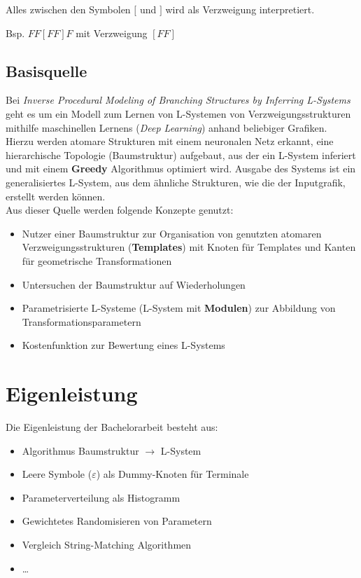 \documentclass[11pt]{article}
\begin{document}
    \newpage
    Alles zwischen den Symbolen $[$ und $]$ wird als Verzweigung interpretiert.
    \begin{center}
        Bsp. $FF[FF]F$ mit Verzweigung $[FF]$
    \end{center}

    \subsection{Basisquelle}
    Bei \textit{Inverse Procedural Modeling of Branching Structures by Inferring L-Systems}\cite{2} geht es um ein
    Modell zum Lernen von L-Systemen von Verzweigungsstrukturen mithilfe maschinellen Lernens (\textit{Deep
    Learning}) anhand beliebiger Grafiken.
    Hierzu werden atomare Strukturen mit einem neuronalen Netz erkannt, eine hierarchische Topologie (Baumstruktur)
    aufgebaut, aus der ein L-System inferiert und mit einem \textbf{Greedy} Algorithmus optimiert wird.
    Ausgabe des Systems ist ein generalisiertes L-System, aus dem ähnliche Strukturen, wie die der Inputgrafik,
    erstellt werden können.\\
    Aus dieser Quelle werden folgende Konzepte genutzt:
    \begin{itemize}
        \item Nutzer einer Baumstruktur zur Organisation von genutzten atomaren Verzweigungsstrukturen
        (\textbf{Templates}) mit Knoten für Templates und Kanten für geometrische Transformationen
        \item Untersuchen der Baumstruktur auf Wiederholungen
        \item Parametrisierte L-Systeme (L-System mit \textbf{Modulen}) zur Abbildung von Transformationsparametern
        \item Kostenfunktion zur Bewertung eines L-Systems
    \end{itemize}


    \section{Eigenleistung}
    Die Eigenleistung der Bachelorarbeit besteht aus:
    \begin{itemize}
        \item Algorithmus Baumstruktur $\rightarrow$ L-System
        \item Leere Symbole ($\varepsilon$) als Dummy-Knoten für Terminale
        \item Parameterverteilung als Histogramm
        \item Gewichtetes Randomisieren von Parametern
        \item Vergleich String-Matching Algorithmen
        \item \dots
    \end{itemize}
\end{document}
